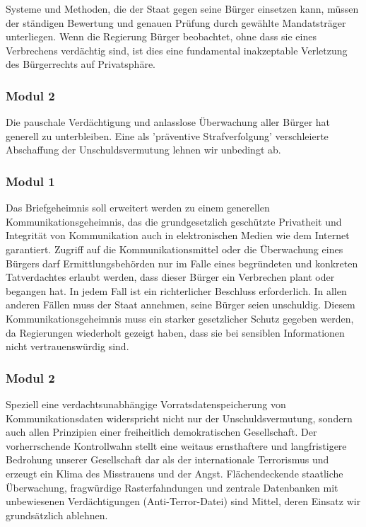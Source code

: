 Systeme und Methoden, die der Staat gegen seine Bürger einsetzen kann, müssen der ständigen Bewertung und genauen Prüfung durch gewählte Mandatsträger unterliegen. Wenn die Regierung Bürger beobachtet, ohne dass sie eines Verbrechens verdächtig sind, ist dies eine fundamental inakzeptable Verletzung des Bürgerrechts auf Privatsphäre.

\subsubsection{Modul 2}
\abstimmung
Die pauschale Verdächtigung und anlasslose Überwachung aller Bürger hat generell zu unterbleiben. Eine als 'präventive Strafverfolgung' verschleierte Abschaffung der Unschuldsvermutung lehnen wir unbedingt ab.
 
\subsubsection{Modul 1}
\abstimmung
Das Briefgeheimnis soll erweitert werden zu einem generellen Kommunikationsgeheimnis, das die grundgesetzlich geschützte Privatheit und Integrität von Kommunikation auch in elektronischen Medien wie dem Internet garantiert. Zugriff auf die Kommunikationsmittel oder die Überwachung eines Bürgers darf Ermittlungsbehörden nur im Falle eines begründeten und konkreten Tatverdachtes erlaubt werden, dass dieser Bürger ein Verbrechen plant oder begangen hat. In jedem Fall ist ein richterlicher Beschluss erforderlich. In allen anderen Fällen muss der Staat annehmen, seine Bürger seien unschuldig. Diesem Kommunikationsgeheimnis muss ein starker gesetzlicher Schutz gegeben werden, da Regierungen wiederholt gezeigt haben, dass sie bei sensiblen Informationen nicht vertrauenswürdig sind.

\subsubsection{Modul 2}
\abstimmung
Speziell eine verdachtsunabhängige Vorratsdatenspeicherung von Kommunikationsdaten widerspricht nicht nur der Unschuldsvermutung, sondern auch allen Prinzipien einer freiheitlich demokratischen Gesellschaft. Der vorherrschende Kontrollwahn stellt eine weitaus ernsthaftere und langfristigere Bedrohung unserer Gesellschaft dar als der internationale Terrorismus und erzeugt ein Klima des Misstrauens und der Angst. Flächendeckende staatliche Überwachung, fragwürdige Rasterfahndungen und zentrale Datenbanken mit unbewiesenen Verdächtigungen (Anti-Terror-Datei) sind Mittel, deren Einsatz wir grundsätzlich ablehnen.
 
